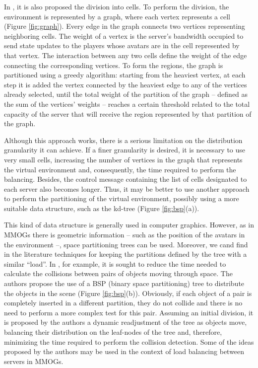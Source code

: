 \documentclass[acmjacm]{acmtrans2m}
\begin{document}
In \cite{bezerra2009lbs}, it is also proposed the division into cells. To perform the division, the environment is represented by a graph, where each vertex represents a cell (Figure \ref{fig:graph}). Every edge in the graph connects two vertices representing neighboring cells. The weight of a vertex is the server's bandwidth occupied to send state updates to the players whose avatars are in the cell represented by that vertex. The interaction between any two cells define the weight of the edge connecting the corresponding vertices. To form the regions, the graph is partitioned using a greedy algorithm: starting from the heaviest vertex, at each step it is added the vertex connected by the heaviest edge to any of the vertices already selected, until the total weight of the partition of the graph -- defined as the sum of the vertices' weights -- reaches a certain threshold related to the total capacity of the server that will receive the region represented by that partition of the graph.

Although this approach works, there is a serious limitation on the distribution granularity it can achieve. If a finer granularity is desired, it is necessary to use very small cells, increasing the number of vertices in the graph that represents the virtual environment and, consequently, the time required to perform the balancing. Besides, the control message containing the list of cells designated to each server also becomes longer. Thus, it may be better to use another approach to perform the partitioning of the virtual environment, possibly using a more suitable data structure, such as the kd-tree \cite{bentley1975mbs}(Figure \ref{fig:bsp}(a)).

This kind of data structure is generally used in computer graphics. However, as in MMOGs there is geometric information -- such as the position of the avatars in the environment --, space partitioning trees can be used. Moreover, we cand find in the literature techniques for keeping the partitions defined by the tree with a similar ``load''. In \cite{luque2005bpc}, for example, it is sought to reduce the time needed to calculate the collisions between pairs of objects moving through space. The authors propose the use of a BSP (binary space partitioning) tree to distribute the objects in the scene (Figure \ref{fig:bsp}(b)). Obviously, if each object of a pair is completely inserted in a different partition, they do not collide and there is no need to perform a more complex test for this pair. Assuming an initial division, it is proposed by the authors a dynamic readjustment of the tree as objects move, balancing their distribution on the leaf-nodes of the tree and, therefore, minimizing the time required to perform the collision detection. Some of the ideas proposed by the authors may be used in the context of load balancing between servers in MMOGs.
\end{document}

